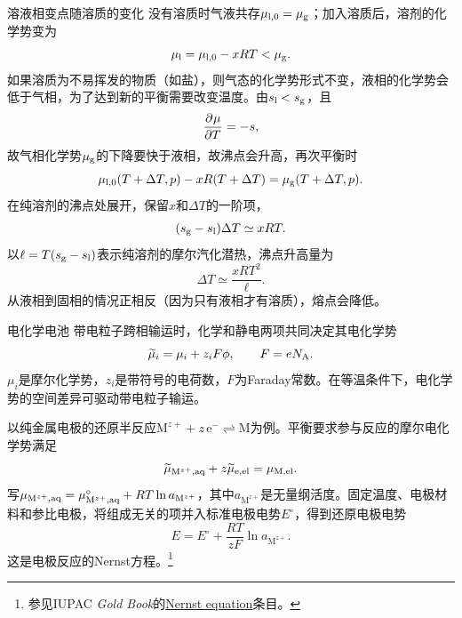 \begin{example}
	{溶液相变点随溶质的变化}{}
	没有溶质时气液共存$\mu_{\mathrm l,0} = \mu_\mathrm g$；加入溶质后，溶剂的化学势变为
	\[
		\mu_\mathrm l = \mu_{\mathrm l,0} - xRT < \mu_\mathrm g.
	\]
	如果溶质为不易挥发的物质（如盐），则气态的化学势形式不变，液相的化学势会低于气相，为了达到新的平衡需要改变温度。由$s_\mathrm l < s_\mathrm g$，且
	\[
		\frac{\partial^{}\mu}{\partial{T}^{}} = -s,
	\]
	故气相化学势$\mu_\mathrm g$的下降要快于液相，故沸点会升高，再次平衡时
	\[
		\mu_{\mathrm l,0}(T + \Delta T,p) - xR(T + \Delta T) = \mu_\mathrm g(T + \Delta T,p).
	\]
	在纯溶剂的沸点处展开，保留$x$和$\Delta T$的一阶项，
	\[
		(s_\mathrm g - s_\mathrm l)\Delta T \simeq xRT .
	\]
	以$\ell = T(s_\mathrm g - s_\mathrm l)$表示纯溶剂的摩尔汽化潜热，沸点升高量为
	\begin{equation}
		\Delta T \simeq \frac{xRT^2}\ell .
	\end{equation}
	从液相到固相的情况正相反（因为只有液相才有溶质），熔点会降低。
\end{example}
\begin{example}
	{电化学电池}{}
	带电粒子跨相输运时，化学和静电两项共同决定其电化学势
	\begin{equation}
		\label{eq:sm-electrochemical-potential}
		\widetilde\mu_i = \mu_i + z_iF\phi,\qquad F = eN_{\mathrm{A}} .
	\end{equation}
	$\mu_i$是摩尔化学势，$z_i$是带符号的电荷数，$F$为Faraday常数。在等温条件下，电化学势的空间差异可驱动带电粒子输运。
	
	以纯金属电极的还原半反应$\mathrm{M}^{z+} + z\,\mathrm e^- \rightleftharpoons \mathrm M$为例。平衡要求参与反应的摩尔电化学势满足
	\[
		\widetilde\mu_{\mathrm{M}^{z+},\mathrm{aq}} + z\widetilde\mu_{\mathrm e,\mathrm{el}} = \mu_{\mathrm M,\mathrm{el}}.
	\]
	写$\mu_{\mathrm{M}^{z+},\mathrm{aq}} = \mu^\circ_{\mathrm{M}^{z+},\mathrm{aq}} + RT\ln a_{\mathrm{M}^{z+}}$，其中$a_{\mathrm{M}^{z+}}$是无量纲活度。固定温度、电极材料和参比电极，将组成无关的项并入标准电极电势$E^\circ$，得到还原电极电势
	\begin{equation}
		\label{eq:sm-nernst-equation}
		E = E^\circ + \frac{RT}{zF}\ln a_{\mathrm{M}^{z+}}.
	\end{equation}
	这是电极反应的Nernst方程。\footnote{参见IUPAC \textit{Gold Book}的\href{https://goldbook.iupac.org/terms/view/09068}{Nernst equation}条目。}
\end{example}

